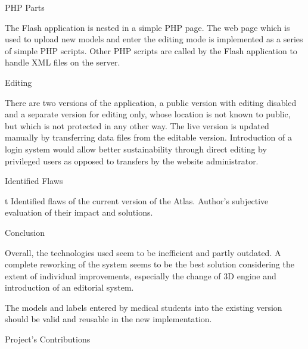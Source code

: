 \secc PHP Parts

The Flash application is nested in a simple PHP page. The web page which is used to upload new models and enter the editing mode is implemented as a series of simple PHP scripts. Other PHP scripts are called by the Flash application to handle XML files on the server.

\secc Editing

There are two versions of the application, a public version with editing disabled and a separate version for editing only, whose location is not known to public, but which is not protected in any other way. The live version is updated manually by transferring data files from the editable version. Introduction of a login system would allow better sustainability through direct editing by privileged users as opposed to transfers by the website administrator.

\secc Identified Flaws


{\def\sizespec{at9pt} \resizeall \tenrm
{}
}
\caption/t Identified flaws of the current version of the Atlas. Author's subjective evaluation of their impact and solutions.


\secc Conclusion

Overall, the technologies used seem to be inefficient and partly outdated. A complete reworking of the system seems to be the best solution considering the extent of individual improvements, especially the change of 3D engine and introduction of an editorial system.

The models and labels entered by medical students into the existing version should be valid and reusable in the new implementation.

\sec Project's Contributions

